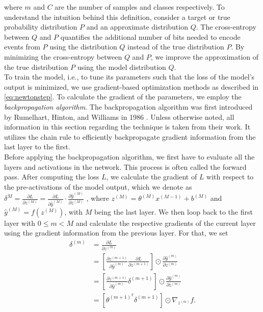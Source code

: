 where $m$ and $C$ are the number of samples and classes respectively.
To understand the intuition behind this definition, consider a target or true probability distribution \(P\) and an approximate distribution \(Q\).
The cross-entropy between \(Q\) and \(P\) quantifies the additional number of bits needed to encode events from \(P\) using the distribution \(Q\) instead of the true distribution \(P\).
By minimizing the cross-entropy between \(Q\) and \(P\), we improve the approximation of the true distribution \(P\) using the model distribution \(Q\).\cite{bishop2006pattern}\\
To train the model, i.e., to tune its parameters such that the loss of the model's output is minimized,
we use gradient-based optimization methods as described in \ref{eq:newtonstep}.
To calculate the gradient of the parameters, we employ the \emph{backpropagation algorithm}.
The backpropagation algorithm was first introduced by Rumelhart, Hinton, and Williams in 1986 \cite{rumelhart1986learning}.
Unless otherwise noted, all information in this section regarding the technique is taken from their work.
It utilizes the chain rule to efficiently backpropagate gradient information from the last layer to the first.\\
Before applying the backpropagation algorithm, we first have to evaluate all the layers and activations in the network.
This process is often called the forward pass.
After computing the loss \(L\), we calculate the gradient of \(L\) with respect to the pre-activations of the model output, which we denote as
$\delta^{M} = \frac{\partial L}{\partial z^{(M)}} = \frac{\partial L}{\partial \hat{y}^{(M)}} \cdot \frac{\partial \hat{y}^{(M)}}{\partial z^{(M)}}$
, where \(z^{(M)} = \theta^{(M)} x^{(M-1)} + b^{(M)}\) and \(\hat{y}^{(M)} = f(z^{(M)})\), with \(M\) being the last layer.
We then loop back to the first layer with \(0 \leq m < M\) and calculate the respective gradients of the current layer using the gradient information from the previous layer. For that, we set
\begin{align}
    \delta^{(m)} &= \frac{\partial L}{\partial z^{(m)}} \\
                 &= \left[  \frac{\partial z^{(m+1)}}{\partial \hat{y}^{(m)}} \frac{\partial L}{\partial z^{(m+1)}} \right] \odot \frac{\partial \hat{y}^{(m)}}{\partial z^{(m)}} \\
                 &= \left[ \frac{\partial z^{(m+1)}}{\partial \hat{y}^{(m)}}  \delta^{(m+1)} \right] \odot \frac{\partial \hat{y}^{(m)}}{\partial z^{(m)}} \\
                 &= \left[ \theta^{(m+1)^T} \delta^{(m+1)}  \right] \odot \nabla_{z^{(m)}} f.
\end{align}

